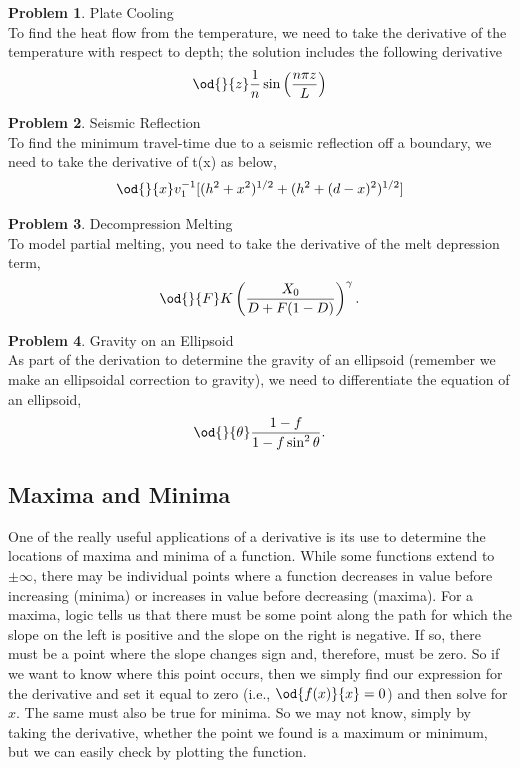 \documentclass[final,a4paper,12pt]{article}
\theoremstyle{definition}
\newtheorem{problem}{Problem}[section]
\begin{document}
\begin{problem}
    Plate Cooling \\
    To find the heat flow from the temperature, we need to take the derivative
    of the temperature with respect to depth; the solution includes the
    following derivative
    \begin{equation*}
        \od{}{z} \frac{1}{n} \sin \left( \frac{n \pi z}{L} \right)
    \end{equation*}
\end{problem}

\begin{problem}
    Seismic Reflection \\
    To find the minimum travel-time due to a seismic reflection off a boundary,
    we need to take the derivative of t(x) as below,
    \begin{equation*}
        \od{}{x} v_1^{-1} [ (h^2 + x^2)^{1/2} + (h^2 + (d - x)^2)^{1/2}]
    \end{equation*}
\end{problem}

\begin{problem}
    Decompression Melting \\
    To model partial melting, you need to take the derivative of the melt
    depression term,
    \begin{equation*}
        \od{}{F} K \left( \frac{X_0}{D + F(1 - D)} \right)^\gamma .
    \end{equation*}
\end{problem}

\begin{problem}
    Gravity on an Ellipsoid \\
    As part of the derivation to determine the gravity of an ellipsoid (remember
    we make an ellipsoidal correction to gravity), we need to differentiate the
    equation of an ellipsoid,
    \begin{equation}
    \od{}{\theta} \frac{1 - f}{1 - f\sin^2 \theta} .
    \end{equation}
\end{problem}

\subsection{Maxima and Minima}
One of the really useful applications of a derivative is its use to determine
the locations of maxima and minima of a function.  While some functions extend
to $\pm\infty$, there may be individual points where a function decreases in
value before increasing (minima) or increases in value before decreasing
(maxima).  For a maxima, logic tells us that there must be some point along the
path for which the slope on the left is positive and the slope on the right is
negative.  If so, there must be a point where the slope changes sign and,
therefore, must be zero.  So if we want to know where this point occurs, then we
simply find our expression for the derivative and set it equal to zero (i.e.,
$\od{f(x)}{x} = 0$) and then solve for $x$.  The same must also be true for
minima.  So we may not know, simply by taking the derivative, whether the point
we found is a maximum or minimum, but we can easily check by plotting the
function.
\end{document}
